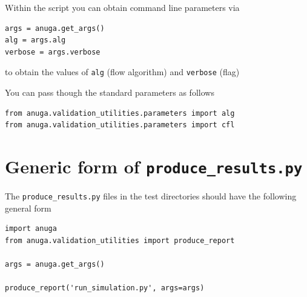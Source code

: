 \documentclass[11pt,a4paper]{report}
\begin{document}
Within the \anuga{} script you can obtain command line parameters via
\begin{verbatim}
args = anuga.get_args()
alg = args.alg
verbose = args.verbose
\end{verbatim}
to obtain the values of \verb|alg| (flow algorithm) and \verb|verbose| (flag)

You can pass though the standard parameters as follows
\begin{verbatim}
from anuga.validation_utilities.parameters import alg
from anuga.validation_utilities.parameters import cfl
\end{verbatim}

\pagebreak
\section{Generic form of \texttt{produce\_results.py}}

The \texttt{produce\_results.py} files in the test directories should have the
following general form

\begin{verbatim}
import anuga
from anuga.validation_utilities import produce_report

args = anuga.get_args()

produce_report('run_simulation.py', args=args)
\end{verbatim}





\end{document}
